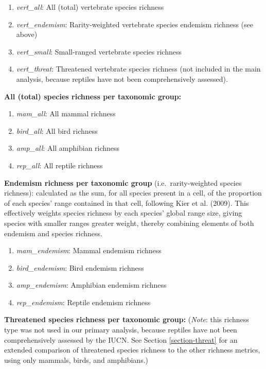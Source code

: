 \documentclass[
]{article}
\providecommand{\tightlist}{%
  \setlength{\itemsep}{0pt}\setlength{\parskip}{0pt}}
\begin{document}
\begin{enumerate}
\def\labelenumi{(\arabic{enumi})}
\setcounter{enumi}{4}
\tightlist
\item
  \emph{vert\_all}: All (total) vertebrate species richness
\item
  \emph{vert\_endemism}: Rarity-weighted vertebrate species endemism richness (see above)
\item
  \emph{vert\_small}: Small-ranged vertebrate species richness
\item
  \emph{vert\_threat}: Threatened vertebrate species richness (not included in the main analysis, because reptiles have not been comprehensively assessed).
\end{enumerate}

\textbf{All (total) species richness per taxonomic group:}

\begin{enumerate}
\def\labelenumi{(\arabic{enumi})}
\setcounter{enumi}{8}
\tightlist
\item
  \emph{mam\_all}: All mammal richness
\item
  \emph{bird\_all}: All bird richness
\item
  \emph{amp\_all}: All amphibian richness
\item
  \emph{rep\_all}: All reptile richness
\end{enumerate}

\textbf{Endemism richness per taxonomic group} (i.e.~rarity-weighted species richness): calculated as the sum, for all species present in a cell, of the proportion of each species' range contained in that cell, following Kier et al. (2009). This effectively weights species richness by each species' global range size, giving species with smaller ranges greater weight, thereby combining elements of both endemism and species richness.

\begin{enumerate}
\def\labelenumi{(\arabic{enumi})}
\setcounter{enumi}{12}
\tightlist
\item
  \emph{mam\_endemism}: Mammal endemism richness
\item
  \emph{bird\_endemism}: Bird endemism richness
\item
  \emph{amp\_endemism}: Amphibian endemism richness
\item
  \emph{rep\_endemism}: Reptile endemism richness
\end{enumerate}

\textbf{Threatened species richness per taxonomic group:} (\emph{Note}: this richness type was not used in our primary analysis, because reptiles have not been comprehensively assessed by the IUCN. See Section \ref{section-threat} for an extended comparison of threatened species richness to the other richness metrics, using only mammals, birds, and amphibians.)
\end{document}
